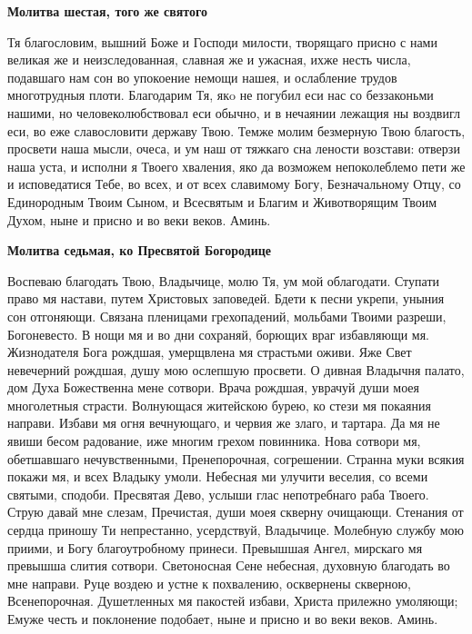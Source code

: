 \medskip
\bfseries Молитва шестая, того же святого\normalfont{}


Тя благословим, вышний Боже и Господи милости, творящаго присно с нами великая же и неизследованная, славная же и ужасная, ихже несть числа, подавшаго нам сон во упокоение немощи нашея, и ослабление трудов многотрудныя плоти. Благодарим Тя, якo не погубил еси нас со беззаконьми нашими, но человеколюбствовал еси обычно, и в нечаянии лежащия ны воздвигл еси, во еже славословити державу Твою. Темже молим безмерную Твою благость, просвети наша мысли, очеса, и ум наш от тяжкаго сна лености возстави: отверзи наша уста, и исполни я Твоего хваления, яко да возможем непоколеблемо пети же и исповедатися Тебе, во всех, и от всех славимому Богу, Безначальному Отцу, со Единородным Твоим Сыном, и Всесвятым и Благим и Животворящим Твоим Духом, ныне и присно и во веки веков. Аминь. 


\medskip
\bfseries Молитва седьмая, ко Пресвятой Богородице\normalfont{}


Воспеваю благодать Твою, Владычице, молю Тя, ум мой облагодати. Ступати право мя настави, путем Христовых заповедей. Бдети к песни укрепи, уныния сон отгоняющи. Связана пленицами грехопадений, мольбами Твоими разреши, Богоневесто. В нощи мя и во дни сохраняй, борющих враг избавляющи мя. Жизнодателя Бога рождшая, умерщвлена мя страстьми оживи. Яже Свет невечерний рождшая, душу мою ослепшую просвети. О дивная Владычня палато, дом Духа Божественна мене сотвори. Врача рождшая, уврачуй души моея многолетныя страсти. Волнующася житейскою бурею, ко стези мя покаяния направи. Избави мя огня вечнующаго, и червия же злаго, и тартара. Да мя не явиши бесом радование, иже многим грехом повинника. Нова сотвори мя, обетшавшаго нечувственными, Пренепорочная, согрешении. Странна муки всякия покажи мя, и всех Владыку умоли. Небесная ми улучити веселия, со всеми святыми, сподоби. Пресвятая Дево, услыши глас непотребнаго раба Твоего. Струю давай мне слезам, Пречистая, души моея скверну очищающи. Стенания от сердца приношу Ти непрестанно, усердствуй, Владычице. Молебную службу мою приими, и Богу благоутробному принеси. Превышшая Ангел, мирскаго мя превышша слития сотвори. Светоносная Сене небесная, духовную благодать во мне направи. Руце воздею и устне к похвалению, осквернены скверною, Всенепорочная. Душетленных мя пакостей избави, Христа прилежно умоляющи; Емуже честь и поклонение подобает, ныне и присно и во веки веков. Аминь. 


